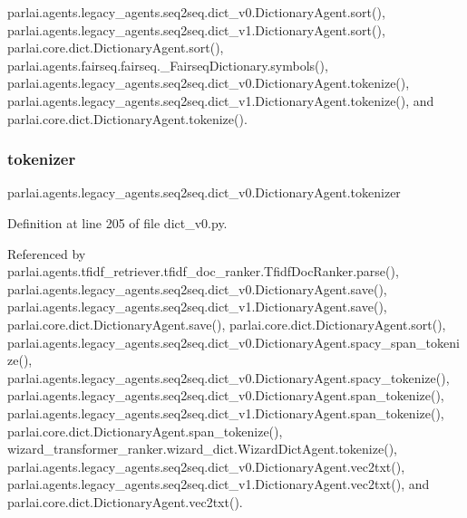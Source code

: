 parlai.\+agents.\+legacy\+\_\+agents.\+seq2seq.\+dict\+\_\+v0.\+Dictionary\+Agent.\+sort(), parlai.\+agents.\+legacy\+\_\+agents.\+seq2seq.\+dict\+\_\+v1.\+Dictionary\+Agent.\+sort(), parlai.\+core.\+dict.\+Dictionary\+Agent.\+sort(), parlai.\+agents.\+fairseq.\+fairseq.\+\_\+\+Fairseq\+Dictionary.\+symbols(), parlai.\+agents.\+legacy\+\_\+agents.\+seq2seq.\+dict\+\_\+v0.\+Dictionary\+Agent.\+tokenize(), parlai.\+agents.\+legacy\+\_\+agents.\+seq2seq.\+dict\+\_\+v1.\+Dictionary\+Agent.\+tokenize(), and parlai.\+core.\+dict.\+Dictionary\+Agent.\+tokenize().

\mbox{\label{classparlai_1_1agents_1_1legacy__agents_1_1seq2seq_1_1dict__v0_1_1DictionaryAgent_a0f5715fd721e9ae974908e6c707df4aa}} 
\subsubsection{\texorpdfstring{tokenizer}{tokenizer}}
{\footnotesize\ttfamily parlai.\+agents.\+legacy\+\_\+agents.\+seq2seq.\+dict\+\_\+v0.\+Dictionary\+Agent.\+tokenizer}



Definition at line 205 of file dict\+\_\+v0.\+py.



Referenced by parlai.\+agents.\+tfidf\+\_\+retriever.\+tfidf\+\_\+doc\+\_\+ranker.\+Tfidf\+Doc\+Ranker.\+parse(), parlai.\+agents.\+legacy\+\_\+agents.\+seq2seq.\+dict\+\_\+v0.\+Dictionary\+Agent.\+save(), parlai.\+agents.\+legacy\+\_\+agents.\+seq2seq.\+dict\+\_\+v1.\+Dictionary\+Agent.\+save(), parlai.\+core.\+dict.\+Dictionary\+Agent.\+save(), parlai.\+core.\+dict.\+Dictionary\+Agent.\+sort(), parlai.\+agents.\+legacy\+\_\+agents.\+seq2seq.\+dict\+\_\+v0.\+Dictionary\+Agent.\+spacy\+\_\+span\+\_\+tokenize(), parlai.\+agents.\+legacy\+\_\+agents.\+seq2seq.\+dict\+\_\+v0.\+Dictionary\+Agent.\+spacy\+\_\+tokenize(), parlai.\+agents.\+legacy\+\_\+agents.\+seq2seq.\+dict\+\_\+v0.\+Dictionary\+Agent.\+span\+\_\+tokenize(), parlai.\+agents.\+legacy\+\_\+agents.\+seq2seq.\+dict\+\_\+v1.\+Dictionary\+Agent.\+span\+\_\+tokenize(), parlai.\+core.\+dict.\+Dictionary\+Agent.\+span\+\_\+tokenize(), wizard\+\_\+transformer\+\_\+ranker.\+wizard\+\_\+dict.\+Wizard\+Dict\+Agent.\+tokenize(), parlai.\+agents.\+legacy\+\_\+agents.\+seq2seq.\+dict\+\_\+v0.\+Dictionary\+Agent.\+vec2txt(), parlai.\+agents.\+legacy\+\_\+agents.\+seq2seq.\+dict\+\_\+v1.\+Dictionary\+Agent.\+vec2txt(), and parlai.\+core.\+dict.\+Dictionary\+Agent.\+vec2txt().

